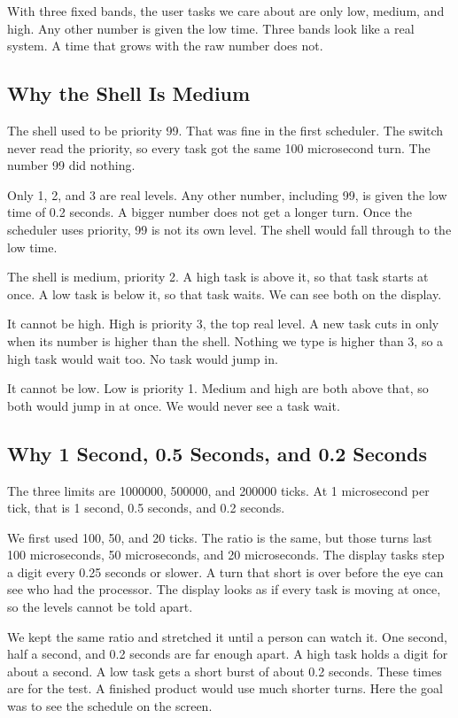 \documentclass[conference,a4paper]{IEEEtran}
\begin{document}
With three fixed bands, the user tasks we care about are only low, medium, and high. Any other number is given the low time. Three bands look like a real system. A time that grows with the raw number does not.

\subsection{Why the Shell Is Medium}

The shell used to be priority 99. That was fine in the first scheduler. The switch never read the priority, so every task got the same 100 microsecond turn. The number 99 did nothing.

Only 1, 2, and 3 are real levels. Any other number, including 99, is given the low time of 0.2 seconds. A bigger number does not get a longer turn. Once the scheduler uses priority, 99 is not its own level. The shell would fall through to the low time.

The shell is medium, priority 2. A high task is above it, so that task starts at once. A low task is below it, so that task waits. We can see both on the display.

It cannot be high. High is priority 3, the top real level. A new task cuts in only when its number is higher than the shell. Nothing we type is higher than 3, so a high task would wait too. No task would jump in.

It cannot be low. Low is priority 1. Medium and high are both above that, so both would jump in at once. We would never see a task wait.

\subsection{Why 1 Second, 0.5 Seconds, and 0.2 Seconds}

The three limits are 1000000, 500000, and 200000 ticks. At 1 microsecond per tick, that is 1 second, 0.5 seconds, and 0.2 seconds.

We first used 100, 50, and 20 ticks. The ratio is the same, but those turns last 100 microseconds, 50 microseconds, and 20 microseconds. The display tasks step a digit every 0.25 seconds or slower. A turn that short is over before the eye can see who had the processor. The display looks as if every task is moving at once, so the levels cannot be told apart.

We kept the same ratio and stretched it until a person can watch it. One second, half a second, and 0.2 seconds are far enough apart. A high task holds a digit for about a second. A low task gets a short burst of about 0.2 seconds. These times are for the test. A finished product would use much shorter turns. Here the goal was to see the schedule on the screen.
\end{document}
